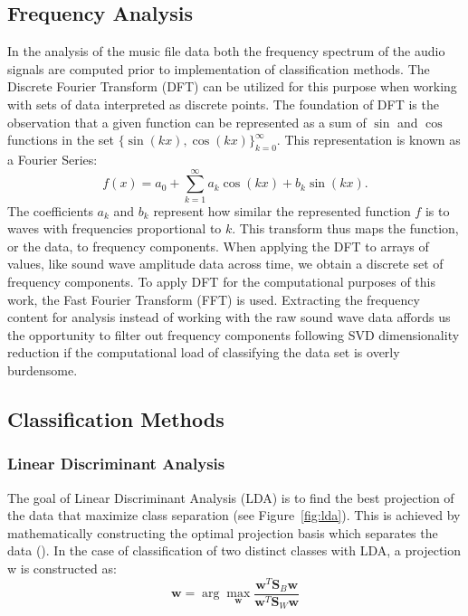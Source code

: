 \documentclass{article}
\begin{document}
\subsection{Frequency Analysis}
In the analysis of the music file data both the frequency spectrum of the audio signals are computed prior to implementation of classification methods. The Discrete Fourier Transform (DFT) can be utilized for this purpose when working with sets of data interpreted as discrete points. The foundation of DFT is the observation that a given function can be represented as a sum of $\sin$ and $\cos$ functions in the set $\{\sin(kx),\cos(kx)\}_{k=0}^\infty$. This representation is known as a Fourier Series:
\begin{equation}\label{eq:fs}
	f(x) = a_0 + \sum^{\infty}_{k=1}a_k\cos(kx)+b_k\sin(kx).
\end{equation} 
The coefficients $a_{k}$ and $b_{k}$ represent how similar the represented function $f$ is to waves with frequencies proportional to $k$. This transform thus maps the function, or the data, to frequency components. When applying the DFT to arrays of values, like sound wave amplitude data across time, we obtain a discrete set of frequency components. To apply DFT for the computational purposes of this work, the Fast Fourier Transform (FFT) is used. Extracting the frequency content for analysis instead of working with the raw sound wave data affords us the opportunity to filter out frequency components following SVD dimensionality reduction if the computational load of classifying the data set is overly burdensome.

\subsection{Classification Methods}
\subsubsection{Linear Discriminant Analysis}
The goal of Linear Discriminant Analysis (LDA) is to find the best projection of the data that maximize class separation (see Figure~\ref{fig:lda}). This is achieved by mathematically constructing the optimal projection basis which separates the data (\cite{kutz_2013}). In the case of classification of two distinct classes with LDA, a projection w is constructed as:
\begin{equation}\label{eq:pb}
\mathbf{w} = \operatorname*{arg}\operatorname*{max}_\mathbf{w} \frac{\mathbf{w}^{T}\mathbf{S}_{B}\mathbf{w}}{\mathbf{w}^{T}\mathbf{S}_{W}\mathbf{w}}
\end{equation}
\end{document}
